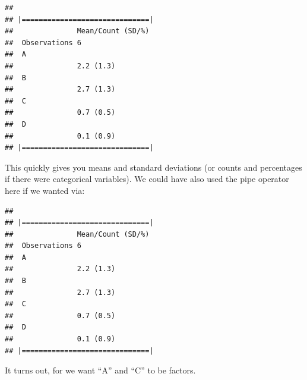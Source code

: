 \documentclass[]{tufte-book}
\newenvironment{Shaded}{}{}
\newcommand{\KeywordTok}[1]{\textcolor[rgb]{0.00,0.44,0.13}{\textbf{#1}}}
\newcommand{\DataTypeTok}[1]{\textcolor[rgb]{0.56,0.13,0.00}{#1}}
\newcommand{\StringTok}[1]{\textcolor[rgb]{0.25,0.44,0.63}{#1}}
\newcommand{\OperatorTok}[1]{\textcolor[rgb]{0.40,0.40,0.40}{#1}}
\newcommand{\NormalTok}[1]{#1}
\theoremstyle{definition}
\theoremstyle{definition}
\theoremstyle{remark}
\begin{document}
\begin{verbatim}
## 
## |==============================|
##               Mean/Count (SD/%)
##  Observations 6                
##  A                             
##               2.2 (1.3)        
##  B                             
##               2.7 (1.3)        
##  C                             
##               0.7 (0.5)        
##  D                             
##               0.1 (0.9)        
## |==============================|
\end{verbatim}

This quickly gives you means and standard deviations (or counts and
percentages if there were categorical variables). We could have also
used the pipe operator here if we wanted via:

\begin{Shaded}
\end{Shaded}

\begin{verbatim}
## 
## |==============================|
##               Mean/Count (SD/%)
##  Observations 6                
##  A                             
##               2.2 (1.3)        
##  B                             
##               2.7 (1.3)        
##  C                             
##               0.7 (0.5)        
##  D                             
##               0.1 (0.9)        
## |==============================|
\end{verbatim}

It turns out, for we want ``A'' and ``C'' to be factors.

\begin{Shaded}
\end{Shaded}
\end{document}
